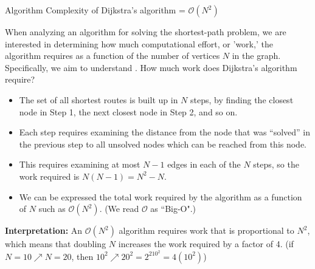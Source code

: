\documentclass[aspectratio=169]{beamer}
\begin{document}
\begin{frame}[plain]{Algorithm Complexity of Dijkstra’s algorithm = $\mathcal{O}(N^2)$}

When analyzing an algorithm for solving the shortest-path problem, 
we are interested in determining how much computational effort, or 'work,' 
the algorithm requires as a function of the number of vertices $N$ in the graph.
\pause
 Specifically, we aim to understand . How much work does Dijkstra's algorithm require? \pause
 \begin{itemize}
   \item The set of all shortest routes is built up in $N$ steps, 
    by finding the closest node in Step 1, the next closest node in Step 2, and so on. \pause
   \item Each step requires examining the distance from the node that was “solved” 
   in the previous step to all unsolved nodes which can be reached from this node. \pause
   \item This requires examining at most $N-1$ edges in each of the $N$ steps,
    so the work required is $N (N-1) =  N^2-N$.\pause
   \item  We can be expressed the total work required by the algorithm 
     as a function of $N$ such as $\mathcal{O}(N^2)$. (We read $\mathcal{O}$
     as ``Big-O".)\pause
 \end{itemize}
 
 {\bf Interpretation:} An $\mathcal{O}(N^2)$ algorithm requires work that is proportional to $N^2$, 
 which means that doubling $N$ increases the work required by a factor of 4.
 (if $N=10\nearrow N=20$, then $10^2 \nearrow 20^2= 2^210^2 = 4 (10^2)$)

\end{frame}
\end{document}
